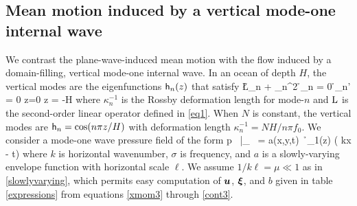\documentclass[12pt, oneside]{book}
\begin{document}
\subsection{Mean motion induced by a vertical mode-one internal wave}

We contrast the plane-wave-induced  mean motion with the flow induced by a domain-filling, vertical mode-one internal wave.  In an ocean of depth $H$, the vertical modes are the eigenfunctions $\mathsf{h}_n(z)$ that satisfy 
\beq
\L \h_n + \kappa_n^2 \h_n = 0 \qquad {} \qquad \h_n' = 0 \quad {} \quad z=0  z = -H \label{vm1} \com
\eeq
where $\kappa^{-1}_n$ is the Rossby deformation length for mode-$n$ and $\mathrm{L}$ is the second-order linear operator defined in \eqref{eq1}.  When $N$ is constant, the vertical modes are $\mathsf{h}_n = \cos (n \pi z / H)$ with deformation length $\kappa_n^{-1} = N H / n \pi f_0$.   We consider a mode-one wave pressure field of the form
\beq
p \, \big |_{}  \, = \; a(x,y,t) \, \h_1(z) \cos( kx - \sigma t) \com 
\label{mode}
\eeq
where $k$ is horizontal wavenumber, $\sigma$ is frequency, and $a$ is a slowly-varying envelope function with horizontal scale $\ell$.  We assume $ 1 / k \ell = \mu  \ll 1$ as in \eqref{slowlyvarying}, which permits easy computation of $\boldsymbol u$, $\boldsymbol {\xi}$, and $b$ given in table \ref{expressions} from equations \eqref{xmom3} through \eqref{cont3}. 
\end{document}
